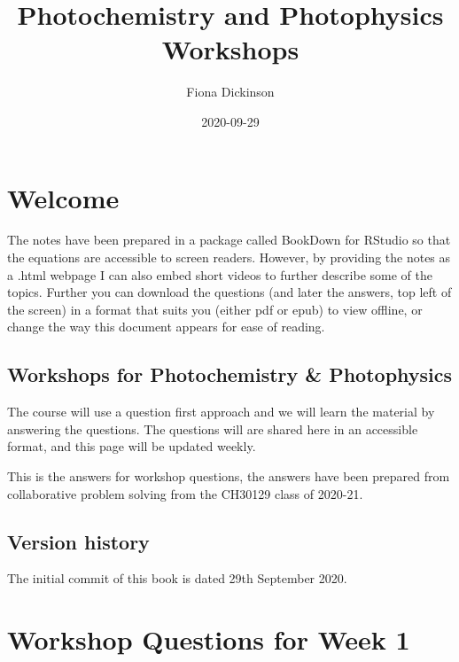 \documentclass[
]{book}
\title{Photochemistry and Photophysics Workshops}
\author{Fiona Dickinson}
\date{2020-09-29}
\begin{document}
\maketitle

{
\setcounter{tocdepth}{1}
\tableofcontents
}
\hypertarget{welcome}{%
\chapter*{Welcome}\label{welcome}}

The notes have been prepared in a package called BookDown for RStudio so that the equations are accessible to screen readers. However, by providing the notes as a .html webpage I can also embed short videos to further describe some of the topics. Further you can download the questions (and later the answers, top left of the screen) in a format that suits you (either pdf or epub) to view offline, or change the way this document appears for ease of reading.

\hypertarget{workshops-for-photochemistry-photophysics}{%
\section*{Workshops for Photochemistry \& Photophysics}\label{workshops-for-photochemistry-photophysics}}

The course will use a question first approach and we will learn the material by answering the questions. The questions will are shared here in an accessible format, and this page will be updated weekly.

This is the answers for workshop questions, the answers have been prepared from collaborative problem solving from the CH30129 class of 2020-21.

\hypertarget{version-history}{%
\section*{Version history}\label{version-history}}

The initial commit of this book is dated 29th September 2020.

\hypertarget{ch:Workshop1}{%
\chapter{Workshop Questions for Week 1}\label{ch:Workshop1}}
\end{document}
